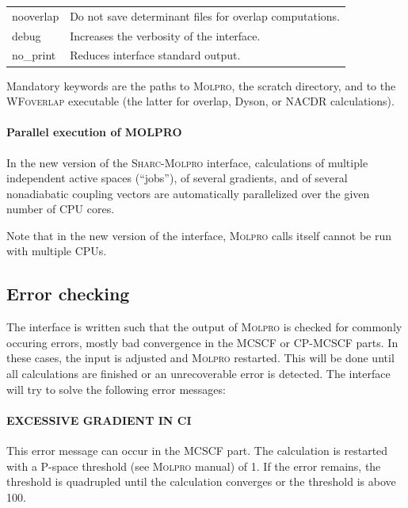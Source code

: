 \documentclass[a4paper,10pt,DIV=15,openany]{scrbook}
\newcommand{\sharc}{\textsc{Sharc}}
\begin{document}
\begin{table}[t]
\begin{tabular}{>{\ttfamily}lp{12cm}}
  nooverlap       &Do not save determinant files for overlap computations.\\
  debug           &Increases the verbosity of the interface.\\
  no\_print       &Reduces interface standard output.\\
  \hline
  \end{tabular}
\end{table}

Mandatory keywords are the paths to \textsc{Molpro}, the scratch directory, and to the \textsc{WFoverlap} executable (the latter for overlap, Dyson, or NACDR calculations).

\paragraph{Parallel execution of MOLPRO}

In the new version of the \sharc-\textsc{Molpro} interface, calculations of multiple independent active spaces (``jobs''), of several gradients, and of several nonadiabatic coupling vectors are automatically parallelized over the given number of CPU cores.

Note that in the new version of the interface, \textsc{Molpro} calls itself cannot be run with multiple CPUs.


\subsection{Error checking}

The interface is written such that the output of \textsc{Molpro} is checked for commonly occuring errors, mostly bad convergence in the MCSCF or CP-MCSCF parts. In these cases, the input is adjusted and \textsc{Molpro} restarted. This will be done until all calculations are finished or an unrecoverable error is detected.
The interface will try to solve the following error messages:

\paragraph{EXCESSIVE GRADIENT IN CI} This error message can occur in the MCSCF part. The calculation is restarted with a P-space threshold (see \textsc{Molpro} manual) of 1. If the error remains, the threshold is quadrupled until the calculation converges or the threshold is above 100.
\end{document}
